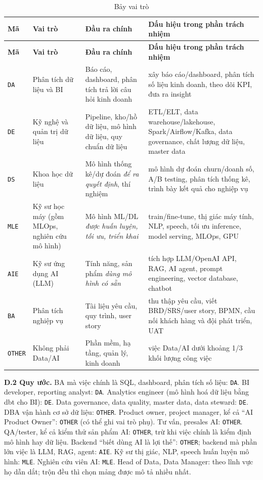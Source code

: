 \documentclass[12pt]{article}
\newcommand{\code}[1]{\texttt{#1}}
\begin{document}
\begin{longtable}{>{\raggedright\arraybackslash}p{1.4cm} >{\raggedright\arraybackslash}p{3.4cm} >{\raggedright\arraybackslash}p{4.4cm} >{\raggedright\arraybackslash}p{5.2cm}}
\caption{Bảy vai trò}\label{tab:roles}\\
\toprule
\textbf{Mã} & \textbf{Vai trò} & \textbf{Đầu ra chính} & \textbf{Dấu hiệu trong phần trách nhiệm} \\
\midrule
\endfirsthead
\toprule
\textbf{Mã} & \textbf{Vai trò} & \textbf{Đầu ra chính} & \textbf{Dấu hiệu trong phần trách nhiệm} \\
\midrule
\endhead
\code{DA} & Phân tích dữ liệu và BI & Báo cáo, dashboard, phân tích trả lời câu hỏi kinh doanh & xây báo cáo/dashboard, phân tích số liệu kinh doanh, theo dõi KPI, đưa ra insight \\
\code{DE} & Kỹ nghệ và quản trị dữ liệu & Pipeline, kho/hồ dữ liệu, mô hình dữ liệu, quy chuẩn dữ liệu & ETL/ELT, data warehouse/lakehouse, Spark/Airflow/Kafka, data governance, chất lượng dữ liệu, master data \\
\code{DS} & Khoa học dữ liệu & Mô hình thống kê/dự đoán \textit{để ra quyết định}, thí nghiệm & mô hình dự đoán churn/doanh số, A/B testing, phân tích thống kê, trình bày kết quả cho nghiệp vụ \\
\code{MLE} & Kỹ sư học máy (gồm MLOps, nghiên cứu mô hình) & Mô hình ML/DL \textit{được huấn luyện, tối ưu, triển khai} & train/fine-tune, thị giác máy tính, NLP, speech, tối ưu inference, model serving, MLOps, GPU \\
\code{AIE} & Kỹ sư ứng dụng AI (LLM) & Tính năng, sản phẩm \textit{dùng mô hình có sẵn} & tích hợp LLM/OpenAI API, RAG, AI agent, prompt engineering, vector database, chatbot \\
\code{BA} & Phân tích nghiệp vụ & Tài liệu yêu cầu, quy trình, user story & thu thập yêu cầu, viết BRD/SRS/user story, BPMN, cầu nối khách hàng và đội phát triển, UAT \\
\code{OTHER} & Không phải Data/AI & Phần mềm, hạ tầng, quản lý, kinh doanh & việc Data/AI dưới khoảng 1/3 khối lượng công việc \\
\bottomrule
\end{longtable}

\textbf{D.2 Quy ước.} BA mà việc chính là SQL, dashboard, phân tích số liệu: \code{DA}. BI developer, reporting analyst: \code{DA}. Analytics engineer (mô hình hoá dữ liệu bằng dbt cho BI): \code{DE}. Data governance, data quality, master data, data steward: \code{DE}. DBA vận hành cơ sở dữ liệu: \code{OTHER}. Product owner, project manager, kể cả ``AI Product Owner'': \code{OTHER} (có thể ghi vai trò phụ). Tư vấn, presales AI: \code{OTHER}. QA/tester, kể cả kiểm thử sản phẩm AI: \code{OTHER}, trừ khi việc chính là kiểm định mô hình hay dữ liệu. Backend ``biết dùng AI là lợi thế'': \code{OTHER}; backend mà phần lớn việc là LLM, RAG, agent: \code{AIE}. Kỹ sư thị giác, NLP, speech huấn luyện mô hình: \code{MLE}. Nghiên cứu viên AI: \code{MLE}. Head of Data, Data Manager: theo lĩnh vực họ dẫn dắt; trộn đều thì chọn mảng được mô tả nhiều nhất.
\end{document}
